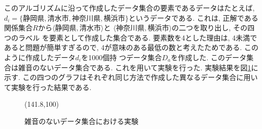 このアルゴリズムに沿って作成したデータ集合の要素であるデータはたとえば, 
$d_i = \{静岡県, 清水市, 神奈川県, 横浜市\}$というデータである. 
これは, 正解である関係集合$R$から$\langle 静岡県, 清水市\rangle$と
$\langle 神奈川県, 横浜市\rangle$の二つを取り出し, その四つのラベル
を要素として作成した集合である. 
要素数を4とした理由は, 4未満であると問題が簡単すぎるので, 
4が意味のある最低の数と考えたためである. 
このように作成したデータ$d_i$を1000個持
つデータ集合$D_a$を作成した. このデータ集合は雑音のないデータ集合である. 
これを用いて実験を行った. 
実験結果を図\ref{graph:art_data}に示す. 
この四つのグラフはそれぞれ同じ方法で作成した異なるデータ集合に用いて実験を行った結果である. 
\begin{figure}[bhpt]
\atari(141.8,100)
\caption{雑音のないデータ集合における実験} \label{graph:art_data}
\end{figure}

